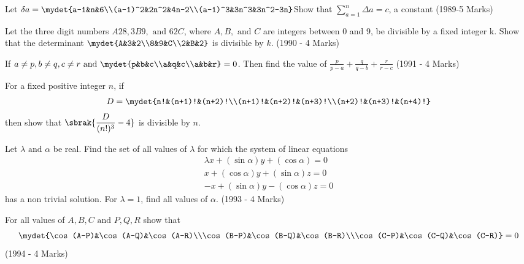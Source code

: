 \item Let $\delta a=\mydet{a-1&n&6\\(a-1)^2&2n^2&4n-2\\(a-1)^3&3n^3&3n^2-3n}\\$Show that $\displaystyle\sum_{a=1}^{n}\Delta a=c$, a constant \hfill (1989-5 Marks)\\[2pt]

\item Let the three digit numbers $A28, 3B9,\text{ and }62C$, where $A, B, \text{ and }C$ are integers between 0 and 9, be divisible by a fixed integer k. Show that the determinant $\mydet{A&3&2\\8&9&C\\2&B&2}$ is divisible by $k$. \hfill (1990 - 4 Marks)\\[2pt]

\item If $a\neq p, b\neq q, c\neq r\text{ and }\mydet{p&b&c\\a&q&c\\a&b&r}=0$. Then find the value of $\displaystyle\frac{p}{p-a}+\frac{q}{q-b}+\frac{r}{r-c}$ \hfill (1991 - 4 Marks)\\[2pt]

\item For a fixed positive integer $n$, if $$D=\mydet{n!&(n+1)!&(n+2)!\\(n+1)!&(n+2)!&(n+3)!\\(n+2)!&(n+3)!&(n+4)!}$$ then show that $\displaystyle\sbrak{\frac{D}{(n!)^3}-4}$ is divisible by $n$.\\[2pt]

\item Let $\lambda\text{ and }\alpha$ be real. Find the set of all values of $\lambda$ for which the system of linear equations \begin{align*}\lambda x+(\sin\alpha)y+(\cos\alpha)=0\\ x+(\cos\alpha)y+(\sin\alpha)z=0\\-x+(\sin\alpha)y-(\cos\alpha)z=0\end{align*} has a non trivial solution. For $\lambda = 1$, find all values of $\alpha$. \hfill (1993 - 4 Marks)\\[2pt]

\item For all values of $A,B,C\text{ and }P,Q,R$ show that $$\mydet{\cos(A-P)&\cos(A-Q)&\cos(A-R)\\\cos(B-P)&\cos(B-Q)&\cos(B-R)\\\cos(C-P)&\cos(C-Q)&\cos(C-R)}=0$$ \hfill (1994 - 4 Marks)\\[2pt]

